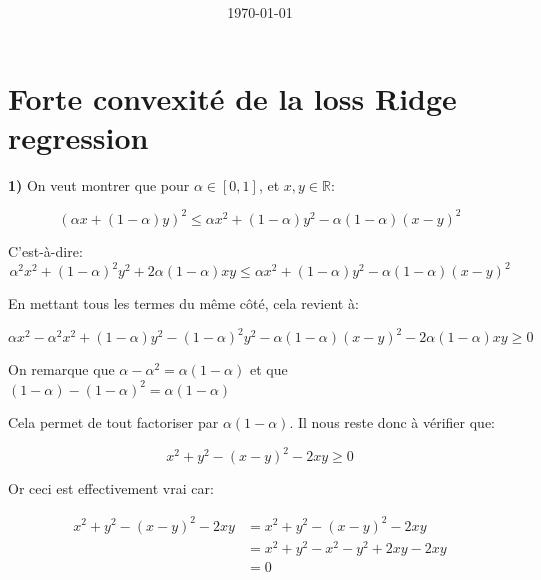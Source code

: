 \documentclass[
10pt, %
a4paper, %
oneside, %
headinclude,footinclude, %
BCOR5mm, %
]{scrartcl}
\title{\normalfont{FTML Exercices 4 solutions}\\
}
\author{\spacedlowsmallcaps{}
}
\date{\today}
\begin{document}
\renewcommand{\sectionmark}[1]{\markright{\spacedlowsmallcaps{#1}}}
\lehead{\mbox{\llap{\small\thepage\kern1em\color{halfgray} \vline}\color{halfgray}\hspace{0.5em}\rightmark\hfil}} 
\pagestyle{scrheadings}
\maketitle 
\setcounter{tocdepth}{3} 

\tableofcontents

\section{\large\color{Blue}Forte convexité de la loss Ridge regression}

\textbf{1)} On veut montrer que pour $\alpha\in [0,1]$, et $x, y\in \mathbb{R}$:

\begin{equation}
    (\alpha x + (1-\alpha)y)^2\leq \alpha x^2 + (1-\alpha)y^2 - \alpha(1-\alpha)(x-y)^2
    \label{eq:}
\end{equation}

C'est-à-dire:
\begin{equation}
    \alpha^2 x^2 + (1-\alpha)^2y^2+2\alpha(1-\alpha)xy\leq \alpha x^2 + (1-\alpha)y^2 - \alpha(1-\alpha)(x-y)^2
    \label{eq:}
\end{equation}

En mettant tous les termes du même côté, cela revient à:

\begin{equation}
    \alpha x^2-\alpha^2 x^2 + (1-\alpha)y^2 -(1-\alpha)^2y^2- \alpha(1-\alpha)(x-y)^2-2\alpha(1-\alpha)xy \geq 0
    \label{eq:}
\end{equation}

On remarque que
$\alpha-\alpha^2=\alpha(1-\alpha)$
et que 
$(1-\alpha)-(1-\alpha)^2=\alpha(1-\alpha)$

Cela permet de tout factoriser par $\alpha(1-\alpha)$. Il nous reste donc à vérifier que:

\begin{equation}
     x^2 + y^2- (x-y)^2-2xy \geq 0
    \label{eq:}
\end{equation}

Or ceci est effectivement vrai car:

     \begin{align}
         x^2 + y^2- (x-y)^2-2xy
         &= x^2 + y^2- (x-y)^2-2xy \\
         &= x^2 + y^2- x^2-y^2+2xy-2xy \\
         &= 0\\
     \end{align}
\end{document}
